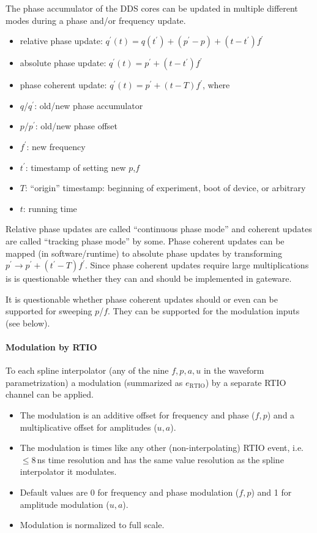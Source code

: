 \documentclass[english]{article}
\begin{document}
The phase accumulator of the DDS cores can be updated in multiple different modes during a phase and/or frequency update.

\begin{itemize}
	\item relative phase update: $q^\prime(t) = q(t^\prime) + (p^\prime - p) + (t - t^\prime) f^\prime$
	\item absolute phase update: $q^\prime(t) = p^\prime + (t - t^\prime) f^\prime$
	\item phase coherent update: $q^\prime(t) = p^\prime + (t - T) f^\prime$, where
	\item $q$/$q^\prime$: old/new phase accumulator
	\item $p$/$p^\prime$: old/new phase offset
	\item $f^\prime$: new frequency
	\item $t^\prime$: timestamp of setting new $p$,$f$
	\item $T$: ``origin'' timestamp: beginning of experiment, boot of device, or arbitrary
	\item $t$: running time
\end{itemize}

Relative phase updates are called ``continuous phase mode'' and coherent updates are called ``tracking phase mode'' by some.
Phase coherent updates can be mapped (in software/runtime) to absolute phase updates by transforming $p^\prime \longrightarrow p^\prime + (t^\prime - T) f^\prime$.
Since phase coherent updates require large multiplications is is questionable whether they can and should be implemented in gateware.

It is questionable whether phase coherent updates should or even can be supported for sweeping $p$/$f$. They can be supported for the modulation inputs (see below).

\paragraph{Modulation by RTIO}

To each spline interpolator (any of the nine $f,p,a,u$ in the waveform
parametrization) a modulation (summarized as $e_\mathrm{RTIO}$) by a separate RTIO channel can be applied.


\begin{itemize}
	\item The modulation is an additive offset for frequency and phase ($f,p$) and a multiplicative offset for amplitudes ($u,a$).
	\item The modulation is times like any other (non-interpolating) RTIO event, i.e. $\leq 8$\,ns time resolution and has the same value resolution as the spline interpolator it modulates.
	\item Default values are 0 for frequency and phase modulation ($f,p$) and 1 for amplitude modulation ($u,a$).
	\item Modulation is normalized to full scale.
\end{itemize}
\end{document}

